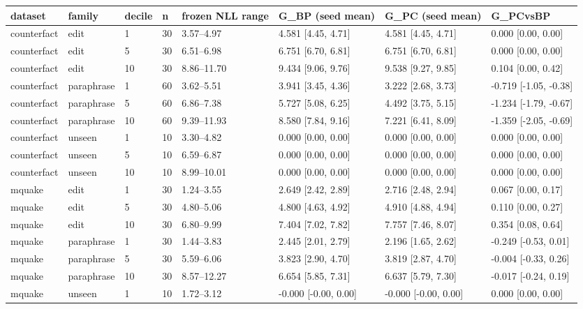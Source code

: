\documentclass[10pt,a4paper]{article}
\begin{document}
\begin{center}\scriptsize
\begin{tabularx}{\textwidth}{@{}p{}XXXXXXX@{}}
\toprule
dataset & family & decile & n & frozen NLL range & G\_BP (seed mean) & G\_PC (seed mean) & G\_PCvsBP \\ \midrule
counterfact & edit & 1 & 30 & 3.57–4.97 & 4.581 [4.45, 4.71] & 4.581 [4.45, 4.71] & 0.000 [0.00, 0.00] \\
counterfact & edit & 5 & 30 & 6.51–6.98 & 6.751 [6.70, 6.81] & 6.751 [6.70, 6.81] & 0.000 [0.00, 0.00] \\
counterfact & edit & 10 & 30 & 8.86–11.70 & 9.434 [9.06, 9.76] & 9.538 [9.27, 9.85] & 0.104 [0.00, 0.42] \\
counterfact & paraphrase & 1 & 60 & 3.62–5.51 & 3.941 [3.45, 4.36] & 3.222 [2.68, 3.73] & -0.719 [-1.05, -0.38] \\
counterfact & paraphrase & 5 & 60 & 6.86–7.38 & 5.727 [5.08, 6.25] & 4.492 [3.75, 5.15] & -1.234 [-1.79, -0.67] \\
counterfact & paraphrase & 10 & 60 & 9.39–11.93 & 8.580 [7.84, 9.16] & 7.221 [6.41, 8.09] & -1.359 [-2.05, -0.69] \\
counterfact & unseen & 1 & 10 & 3.30–4.82 & 0.000 [0.00, 0.00] & 0.000 [0.00, 0.00] & 0.000 [0.00, 0.00] \\
counterfact & unseen & 5 & 10 & 6.59–6.87 & 0.000 [0.00, 0.00] & 0.000 [0.00, 0.00] & 0.000 [0.00, 0.00] \\
counterfact & unseen & 10 & 10 & 8.99–10.01 & 0.000 [0.00, 0.00] & 0.000 [0.00, 0.00] & 0.000 [0.00, 0.00] \\
mquake & edit & 1 & 30 & 1.24–3.55 & 2.649 [2.42, 2.89] & 2.716 [2.48, 2.94] & 0.067 [0.00, 0.17] \\
mquake & edit & 5 & 30 & 4.80–5.06 & 4.800 [4.63, 4.92] & 4.910 [4.88, 4.94] & 0.110 [0.00, 0.27] \\
mquake & edit & 10 & 30 & 6.80–9.99 & 7.404 [7.02, 7.82] & 7.757 [7.46, 8.07] & 0.354 [0.08, 0.64] \\
mquake & paraphrase & 1 & 30 & 1.44–3.83 & 2.445 [2.01, 2.79] & 2.196 [1.65, 2.62] & -0.249 [-0.53, 0.01] \\
mquake & paraphrase & 5 & 30 & 5.59–6.06 & 3.823 [2.90, 4.70] & 3.819 [2.87, 4.70] & -0.004 [-0.33, 0.26] \\
mquake & paraphrase & 10 & 30 & 8.57–12.27 & 6.654 [5.85, 7.31] & 6.637 [5.79, 7.30] & -0.017 [-0.24, 0.19] \\
mquake & unseen & 1 & 10 & 1.72–3.12 & -0.000 [-0.00, 0.00] & -0.000 [-0.00, 0.00] & 0.000 [0.00, 0.00] \\

\end{tabularx}
\end{center}
\end{document}
